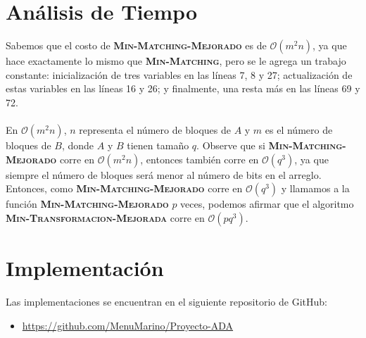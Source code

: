 \documentclass[12pt,a4,paper]{article}
\begin{document}
\section*{Análisis de Tiempo}

Sabemos que el costo de \textbf{\textsc{Min-Matching-Mejorado}} es de $\mathcal{O}(m^{2}n)$, ya que hace exactamente lo mismo que \textbf{\textsc{Min-Matching}}, pero se le agrega un trabajo constante: inicialización de tres variables en las líneas 7, 8 y 27; actualización de estas variables en las líneas 16 y 26; y finalmente, una resta más en las líneas 69 y 72. \\\\ 
En $\mathcal{O}(m^{2}n)$, $n$ representa el número de bloques de $A$ y $m$ es el número de bloques de $B$, donde $A$ y $B$ tienen tamaño $q$. Observe que si \textbf{\textsc{Min-Matching-Mejorado}} corre en $\mathcal{O}(m^{2}n)$, entonces también corre en $\mathcal{O}(q^3)$, ya que siempre el número de bloques será menor al número de bits en el arreglo. Entonces, como \textbf{\textsc{Min-Matching-Mejorado}} corre en $\mathcal{O}(q^3)$ y llamamos a la función \textbf{\textsc{Min-Matching-Mejorado}} $p$ veces, podemos afirmar que el algoritmo \textbf{\textsc{Min-Transformacion-Mejorada}} corre en $\mathcal{O}(pq^3)$.

\section*{Implementación}

Las implementaciones se encuentran en el siguiente repositorio de GitHub:

\begin{itemize}
    \item \url{https://github.com/MenuMarino/Proyecto-ADA}
\end{itemize}

\newpage
\end{document}
